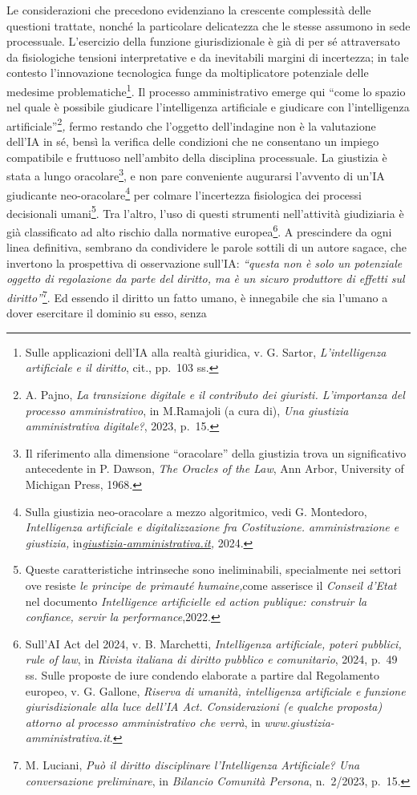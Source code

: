 \documentclass[american,a4paper,]{article}
\begin{document}
Le considerazioni che precedono evidenziano la crescente complessità delle questioni trattate, nonché la particolare delicatezza che le stesse assumono in sede processuale. L'esercizio della funzione giurisdizionale è già di per sé attraversato da fisiologiche tensioni interpretative e da inevitabili margini di incertezza; in tale contesto l'innovazione tecnologica funge da moltiplicatore potenziale delle medesime problematiche\footnote{Sulle applicazioni dell'IA alla realtà giuridica, v. G. Sartor, \emph{L'intelligenza artificiale e il diritto}, cit., pp.~103 ss.}. Il processo amministrativo emerge qui ``come lo spazio nel quale è possibile giudicare l'intelligenza artificiale e giudicare con l'intelligenza artificiale''\footnote{A. Pajno, \emph{La transizione digitale e il contributo dei giuristi. L'importanza del processo amministrativo}, in M.Ramajoli (a cura di), \emph{Una giustizia amministrativa digitale?}, 2023, p.~15.}\emph{,} fermo restando che l'oggetto dell'indagine non è la valutazione dell'IA in sé, bensì la verifica delle condizioni che ne consentano un impiego compatibile e fruttuoso nell'ambito della disciplina processuale. La giustizia è stata a lungo oracolare\footnote{Il riferimento alla dimensione ``oracolare'' della giustizia trova un significativo antecedente in P. Dawson, \emph{The Oracles of the Law}, Ann Arbor, University of Michigan Press, 1968.}, e non pare conveniente augurarsi l'avvento di un'IA giudicante neo-oracolare\footnote{Sulla giustizia neo-oracolare a mezzo algoritmico, vedi G. Montedoro, \emph{Intelligenza artificiale e digitalizzazione fra Costituzione. amministrazione e giustizia,} in\emph{\href{http://giustizia-amministrativa.it}{\ul{giustizia-amministrativa.it}},} 2024.} per colmare l'incertezza fisiologica dei processi decisionali umani\footnote{Queste caratteristiche intrinseche sono ineliminabili, specialmente nei settori ove resiste \emph{le principe de primauté humaine,}come asserisce il \emph{Conseil d'Etat} nel documento \emph{Intelligence artificielle ed action publique: construir la confiance, servir la performance},2022.}. Tra l'altro, l'uso di questi strumenti nell'attività giudiziaria è già classificato ad alto rischio dalla normative europea\footnote{Sull'AI Act del 2024, v. B. Marchetti, \emph{Intelligenza artificiale, poteri pubblici, rule of law}, in \emph{Rivista italiana di diritto pubblico e comunitario}, 2024, p.~49 ss. Sulle proposte de iure condendo elaborate a partire dal Regolamento europeo, v. G. Gallone, \emph{Riserva di umanità, intelligenza artificiale e funzione giurisdizionale alla luce dell'IA Act. Considerazioni (e qualche proposta) attorno al processo amministrativo che verrà}, in \emph{www.giustizia-amministrativa.it}.}. A prescindere da ogni linea definitiva, sembrano da condividere le parole sottili di un autore sagace, che invertono la prospettiva di osservazione sull'IA: \emph{``\emph{questa non è solo un potenziale oggetto di regolazione da parte del diritto, ma è un sicuro produttore di effetti sul diritto}''}\footnote{M. Luciani, \emph{Può il diritto disciplinare l'Intelligenza Artificiale? Una conversazione preliminare}, in \emph{Bilancio Comunità Persona}, n.~2/2023, p.~15.}. Ed essendo il diritto un fatto umano, è innegabile che sia l'umano a dover esercitare il dominio su esso, senza 
\end{document}
